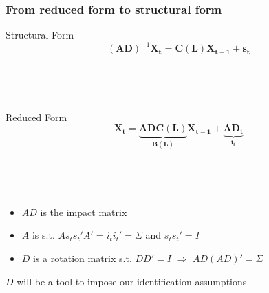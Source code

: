 \documentclass{beamer}
\begin{document}
\begin{frame}
	\frametitle{From reduced form to structural form}
	\label{identification}
	
Structural Form	
\begin{equation}
(\mathbf{AD})^{-1}
    \mathbf{X_{t}}
= \mathbf{C(L)} 
\mathbf{X_{t-1}}
+ \mathbf{s_t}
\end{equation}

\

\

Reduced Form
\begin{equation}
\mathbf{X_{t}}
= \underbrace{\mathbf{AD} \mathbf{C(L)}}_\text{$\mathbf{B(L)}$} 
\mathbf{X_{t-1}}
+ \underbrace{\mathbf{AD} \mathbf{_t}}_\text{$\mathbf{i_t}$}
\end{equation}

\

\

\begin{itemize}
	\item $AD$ is the impact matrix
	\item $A$ is s.t. $As_t s_t' A' = i_t i_t' = \Sigma$ and $s_t s_t' = I$
	\item $D$ is a rotation matrix s.t. $DD' = I$ $\Rightarrow$ $AD(AD)' = \Sigma$
\end{itemize}

$D$ will be a tool to impose our identification assumptions \hyperlink{Technicalities}{}

\end{frame}
\end{document}
